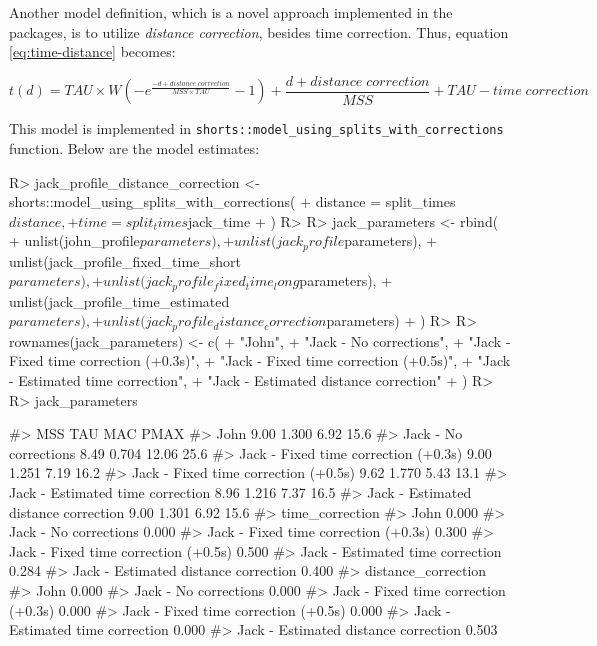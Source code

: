 \documentclass[
]{jss}
\begin{document}
Another model definition, which is a novel approach implemented in the  packages, is to utilize \emph{distance correction}, besides time correction. Thus, equation \eqref{eq:time-distance} becomes:

\begin{equation}
  t(d) = TAU \times W(-e^{\frac{-d + distance \; correction}{MSS \times TAU}} - 1) + \frac{d + distance \; correction}{MSS} + TAU - time \; correction \label{eq:distance-correction}
\end{equation}

This model is implemented in \texttt{shorts::model\_using\_splits\_with\_corrections} function. Below are the model estimates:

\begin{CodeChunk}
\begin{CodeInput}
R> jack_profile_distance_correction <- shorts::model_using_splits_with_corrections(
+   distance = split_times$distance,
+   time = split_times$jack_time
+ )
R> 
R> jack_parameters <- rbind(
+   unlist(john_profile$parameters),
+   unlist(jack_profile$parameters),
+   unlist(jack_profile_fixed_time_short$parameters),
+   unlist(jack_profile_fixed_time_long$parameters),
+   unlist(jack_profile_time_estimated$parameters),
+   unlist(jack_profile_distance_correction$parameters)
+ )
R> 
R> rownames(jack_parameters) <- c(
+   "John",
+   "Jack - No corrections",
+   "Jack - Fixed time correction (+0.3s)",
+   "Jack - Fixed time correction (+0.5s)",
+   "Jack - Estimated time correction",
+   "Jack - Estimated distance correction"
+ )
R> 
R> jack_parameters
\end{CodeInput}
\begin{CodeOutput}
#>                                       MSS   TAU   MAC PMAX
#> John                                 9.00 1.300  6.92 15.6
#> Jack - No corrections                8.49 0.704 12.06 25.6
#> Jack - Fixed time correction (+0.3s) 9.00 1.251  7.19 16.2
#> Jack - Fixed time correction (+0.5s) 9.62 1.770  5.43 13.1
#> Jack - Estimated time correction     8.96 1.216  7.37 16.5
#> Jack - Estimated distance correction 9.00 1.301  6.92 15.6
#>                                      time_correction
#> John                                           0.000
#> Jack - No corrections                          0.000
#> Jack - Fixed time correction (+0.3s)           0.300
#> Jack - Fixed time correction (+0.5s)           0.500
#> Jack - Estimated time correction               0.284
#> Jack - Estimated distance correction           0.400
#>                                      distance_correction
#> John                                               0.000
#> Jack - No corrections                              0.000
#> Jack - Fixed time correction (+0.3s)               0.000
#> Jack - Fixed time correction (+0.5s)               0.000
#> Jack - Estimated time correction                   0.000
#> Jack - Estimated distance correction               0.503
\end{CodeOutput}
\end{CodeChunk}
\end{document}
